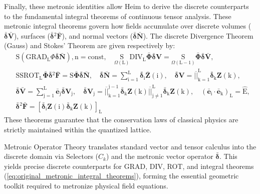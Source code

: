 \documentclass[12pt]{article}
\begin{document}
Finally, these metronic identities allow Heim to derive the discrete counterparts to the fundamental integral theorems of continuous tensor analysis. These metronic integral theorems govern how fields accumulate over discrete volumes ($\bar{\bm{\delta}}\bar{\mathbf{V}}$), surfaces ($\bar{\bm{\delta}}{}^2\bar{\mathbf{F}}$), and normal vectors ($\bar{\bm{\delta}}\bar{\mathbf{N}}$). The discrete Divergence Theorem (Gauss) and Stokes' Theorem are given respectively by:
\begin{equation}
\begin{aligned}
& \mathrm{S}(\mathrm{GRAD}_\mathrm{L} \Phi \bar{\bm{\delta}}\bar{\mathbf{N}}), \mathrm{n} = \text{const}, \quad \underset{\Omega(\mathrm{L})}{\mathrm{S}} \mathrm{DIV}_\mathrm{L} \bar{\bm{\Phi}} \bar{\bm{\delta}}\mathbf{V} = \underset{\Omega(\mathrm{L-1})}{\mathrm{S}} \bar{\bm{\Phi}} \bar{\bm{\delta}}\bar{\mathbf{V}}, \\
& \mathrm{SSROT}_\mathrm{L} \bar{\bm{\Phi}} \bar{\bm{\delta}}{}^2\bar{\mathbf{F}} = \mathrm{S} \bar{\bm{\Phi}} \bar{\bm{\delta}}\bar{\mathbf{N}}, \quad \bar{\bm{\delta}}\bar{\mathbf{N}} = \sum_{\mathrm{i}=1}^\mathrm{L} \bar{\bm{\delta}}_{\mathrm{i}} \bar{\mathbf{Z}}(\mathrm{i}), \quad \bar{\bm{\delta}}\mathbf{V} = \overline{||}_{\mathrm{k}=1}^\mathrm{L} \bar{\bm{\delta}}_{\mathrm{k}} \mathbf{Z}(\mathrm{k}), \\
& \bar{\bm{\delta}}\bar{\mathbf{V}} = \sum_{\mathrm{j}=1}^\mathrm{L} \bar{\mathbf{e}}_\mathrm{j} \bar{\bm{\delta}}\mathbf{V}_\mathrm{j}, \quad \bar{\bm{\delta}}\mathbf{V}_\mathrm{j} = \overline{||}_{\mathrm{k}=1}^{\mathrm{j}-1} \bar{\bm{\delta}}_{\mathrm{k}} \mathbf{Z}(\mathrm{k}) \overline{||}_{\mathrm{j \neq 1}}^\mathrm{L} \bar{\bm{\delta}}_{\mathrm{k}} \mathbf{Z}(\mathrm{k}), \quad (\bar{\mathbf{e}}_\mathrm{i} \cdot \bar{\mathbf{e}}_\mathrm{k})_\mathrm{L} = \hat{\mathrm{E}}, \\
& \bar{\bm{\delta}}{}^2\bar{\mathbf{F}} = \left[ \bar{\bm{\delta}}_{\mathrm{i}} \mathbf{Z}(\mathrm{i}) \bar{\bm{\delta}}_{\mathrm{k}} \mathbf{Z}(\mathrm{k}) \right]_\mathrm{L}
\end{aligned} \tag{80}
\label{eq:original_metronic_integral_theorems}
\end{equation}
These theorems guarantee that the conservation laws of classical physics are strictly maintained within the quantized lattice.

Metronic Operator Theory translates standard vector and tensor calculus into the discrete domain via Selectors (\(C_k\)) and the metronic vector operator \(\bar{\bm{\delta}}\). This yields precise discrete counterparts for GRAD, DIV, ROT, and integral theorems (\eqref{eq:original_metronic_integral_theorems}), forming the essential geometric toolkit required to metronize physical field equations.
\end{document}

